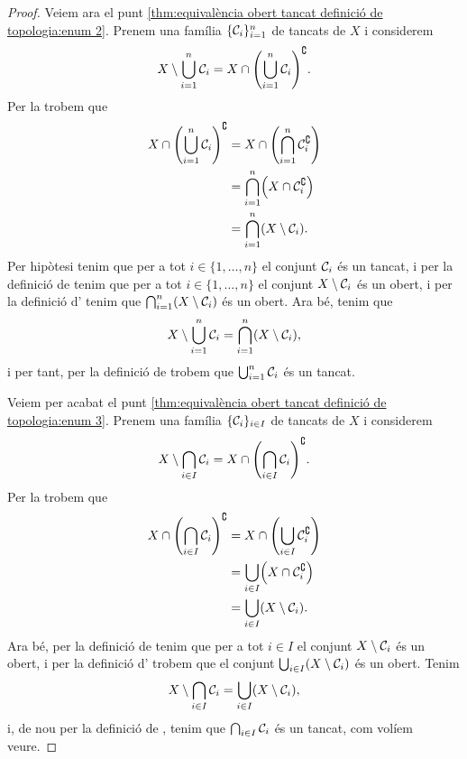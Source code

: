 \documentclass[../Apunts.tex]{subfiles}
\begin{document}
\begin{theorem}
\begin{proof}
			Veiem ara el punt \eqref{thm:equivalència obert tancat definició de topologia:enum 2}. Prenem una família \(\{\mathcal{C}_{i}\}_{i=1}^{n}\) de tancats de \(X\) i considerem
			\[X\setminus\bigcup_{i=1}^{n}\tancat{C}_{i}=X\cap\left(\bigcup_{i=1}^{n}\tancat{C}_{i}\right)^{\complement}.\]
			Per la  trobem que
			\begin{align*}
				X\cap\left(\bigcup_{i=1}^{n}\tancat{C}_{i}\right)^{\complement}&=X\cap\left(\bigcap_{i=1}^{n}\tancat{C}_{i}^{\complement}\right) \\
				&=\bigcap_{i=1}^{n}\left(X\cap\tancat{C}_{i}^{\complement}\right) \\
				&=\bigcap_{i=1}^{n}\left(X\setminus\tancat{C}_{i}\right).
			\end{align*}
			Per hipòtesi tenim que per a tot \(i\in\{1,\dots,n\}\) el conjunt \(\mathcal{C}_{i}\) és un tancat, i per la definició de  tenim que per a tot \(i\in\{1,\dots,n\}\) el conjunt \(X\setminus\mathcal{C}_{i}\) és un obert, i per la definició d' tenim que \(\bigcap_{i=1}^{n}\left(X\setminus\tancat{C}_{i}\right)\) és un obert. Ara bé, tenim que
			\[X\setminus\bigcup_{i=1}^{n}\tancat{C}_{i}=\bigcap_{i=1}^{n}\left(X\setminus\tancat{C}_{i}\right),\]
			i per tant, per la definició de  trobem que \(\bigcup_{i=1}^{n}\mathcal{C}_{i}\) és un tancat.
			
			Veiem per acabat el punt \eqref{thm:equivalència obert tancat definició de topologia:enum 3}. Prenem una família \(\{\mathcal{C}_{i}\}_{i\in I}\) de tancats de \(X\) i considerem
			\[X\setminus\bigcap_{i\in I}\tancat{C}_{i}=X\cap\left(\bigcap_{i\in I}\tancat{C}_{i}\right)^{\complement}.\]
			Per la  trobem que
			\begin{align*}
				X\cap\left(\bigcap_{i\in I}\tancat{C}_{i}\right)^{\complement}&=X\cap\left(\bigcup_{i\in I}\tancat{C}_{i}^{\complement}\right) \\
				&=\bigcup_{i\in I}\left(X\cap\tancat{C}_{i}^{\complement}\right) \\
				&=\bigcup_{i\in I}\left(X\setminus\tancat{C}_{i}\right).
			\end{align*}
			Ara bé, per la definició de  tenim que per a tot \(i\in I\) el conjunt \(X\setminus\mathcal{C}_{i}\) és un obert, i per la definició d' trobem que el conjunt \(\bigcup_{i\in I}\left(X\setminus\tancat{C}_{i}\right)\) és un obert. Tenim
			\[X\setminus\bigcap_{i\in I}\tancat{C}_{i}=\bigcup_{i\in I}\left(X\setminus\tancat{C}_{i}\right),\]
			i, de nou per la definició de , tenim que \(\bigcap_{i\in I}\mathcal{C}_{i}\) és un tancat, com volíem veure.
		\end{proof}
	\end{theorem}
\end{document}
